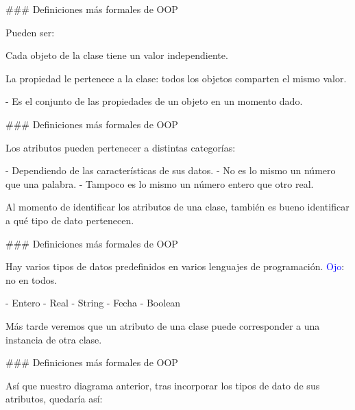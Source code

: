 ### Definiciones más formales de OOP

\newline

Pueden ser:

\begin{description}[leftmargin=3em]
    \item[De instancia:] Cada objeto de la clase tiene un valor independiente.
    \item[De clase:] La propiedad le pertenece a la clase: todos los objetos
    comparten el mismo valor.
\end{description}

\vfill
{}

- Es el conjunto de las propiedades de un objeto en un momento dado.

### Definiciones más formales de OOP

\newline

Los atributos pueden pertenecer a distintas categorías:

- Dependiendo de las características de sus datos.
- No es lo mismo un número que una palabra.
- Tampoco es lo mismo un número entero que otro real.

\vfill
Al momento de identificar los atributos de una clase, también
es bueno identificar a qué tipo de dato pertenecen.

### Definiciones más formales de OOP

\newline

Hay varios tipos de datos predefinidos en varios lenguajes de programación. \textcolor{blue}{Ojo}: no
en todos.

- Entero
- Real
- String
- Fecha
- Boolean

Más tarde veremos que un atributo de una clase puede corresponder a una instancia de otra clase.

### Definiciones más formales de OOP

\newline

Así que nuestro diagrama anterior, tras incorporar los tipos de dato de sus atributos, quedaría así:

\vfill
\centering{}

